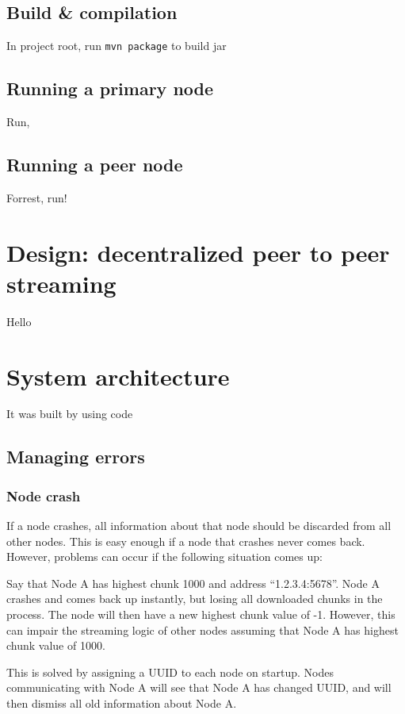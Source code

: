 \documentclass[10pt, a4paper]{article}
\begin{document}
\subsection{Build \& compilation}

In project root, run \texttt{mvn package} to build jar


\subsection{Running a primary node}

Run,

\subsection{Running a peer node}

Forrest, run!

\section{Design: decentralized peer to peer streaming}

Hello

\section{System architecture}

It was built by using code

\subsection{Managing errors}

\subsubsection{Node crash}
If a node crashes, all information about that node should be discarded from all
other nodes. This is easy enough if a node that crashes never comes
back. However, problems can occur if the following situation comes up:

Say that Node A has highest chunk 1000 and address ``1.2.3.4:5678''. Node A
crashes and comes back up instantly, but losing all downloaded chunks in the
process. The node will then have a new highest chunk value of -1. However, this
can impair the streaming logic of other nodes assuming that Node A has highest
chunk value of 1000.

This is solved by assigning a UUID to each node on startup. Nodes communicating
with Node A will see that Node A has changed UUID, and will then dismiss all old
information about Node A.
\end{document}
